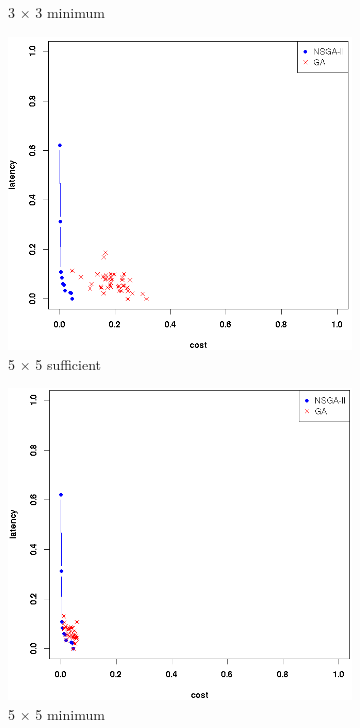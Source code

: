 \documentclass{llncs}
\begin{document}
\begin{figure}[H]
\begin{subfigure}[b]{0.45\textwidth}
		\caption{3 $\times$ 3 minimum}
	\end{subfigure}
	\begin{subfigure}[b]{0.45\textwidth}
		\includegraphics[width=\textwidth]{pics/pop_50_gen_50_5_times_5_suff.png}
		\caption{5 $\times$ 5 sufficient}
	\end{subfigure}
	\begin{subfigure}[b]{0.45\textwidth}
		\includegraphics[width=\textwidth]{pics/pop_50_gen_50_5_times_5_minimum.png}
		\caption{5 $\times$ 5 minimum}
	\end{subfigure}
	\caption{}\label{fig:c1}
\end{figure}
\end{document}
